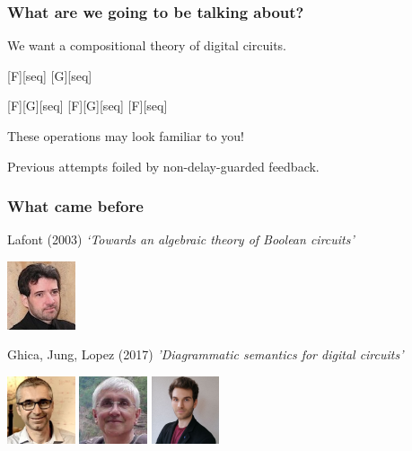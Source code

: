 \begin{frame}
    \frametitle{What are we going to be talking about?}

    \wait

    \centering
    \LARGE
    We want a \alert{compositional} theory of digital circuits.

    \vspace{0.5em}

    \wait
    [F][seq]
    [G][seq]

    \vspace{0.5em}

    \wait
    [F][G][seq]
    \wait
    \quad
    [F][G][seq]
    \wait
    \quad
    [F][seq]

    \wait
    \vspace{0.5em}

    \normalsize
    These operations may look familiar to you!

    \wait

    Previous attempts foiled by \alert{non-delay-guarded feedback}.

\end{frame}

\begin{frame}
    \frametitle{What came before}

    \alert{Lafont (2003)}
    \emph{`Towards an algebraic theory of Boolean circuits'}

    \includegraphics[width=0.15\textwidth]{imgs/lafont}

    \vspace{0.5em}
    \wait

    \alert{Ghica, Jung, Lopez (2017)}
    \emph{'Diagrammatic semantics for digital circuits'}

    \includegraphics[width=0.15\textwidth]{imgs/ghica}
    \includegraphics[width=0.15\textwidth]{imgs/achim}
    \includegraphics[width=0.15\textwidth]{imgs/lopez}
\end{frame}

